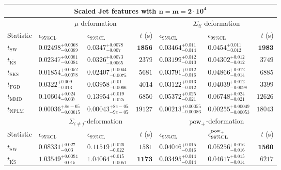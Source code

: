 \begin{tabular}{l|llr|llr}
	\toprule
	\multicolumn{7}{c}{{\bf Scaled Jet features with $\mathbf{n=m=2\cdot 10^{4}}$}} \\
	\toprule
	\multicolumn{1}{c}{} & \multicolumn{3}{c}{$\mu$-deformation} & \multicolumn{3}{c}{$\Sigma_{ii}$-deformation} \\
	Statistic & $\epsilon_{95\%\mathrm{CL}}$ & $\epsilon_{99\%\mathrm    {CL}}$ & $t$ (s) & $\epsilon_{95\%\mathrm{CL}}$ & $\epsilon_{99\%\mathrm{CL}}$ & $t$ (s) \\
	\midrule
	$t_{\mathrm{SW}}$ & $0.02498_{-0.0089}^{+0.0068}$ & $0.0347_{-0.007}^{+0.0078}$ & ${\mathbf{1856}}$ & $0.03464_{-0.014}^{+0.011}$ & $0.0454_{-0.012}^{+0.011}$ & ${\mathbf{1983}}$ \\
	$t_{\overline{\mathrm{KS}}}$ & $0.02347_{-0.0084}^{+0.0081}$ & $0.0326_{-0.0065}^{+0.0073}$ & $2379$ & $0.03199_{-0.013}^{+0.012}$ & $0.04302_{-0.012}^{+0.012}$ & $3749$ \\
	$t_{\mathrm{SKS}}$ & ${\mathbf{0.01854_{-0.0078}^{+0.0052}}}$ & ${\mathbf{0.02407_{-0.0075}^{+0.0044}}}$ & $5681$ & $0.03791_{-0.016}^{+0.012}$ & $0.04866_{-0.014}^{+0.012}$ & $6885$ \\
	$t_{\mathrm{FGD}}$ & $0.0322_{-0.013}^{+0.009}$ & $0.03958_{-0.0066}^{+0.01}$ & $4014$ & ${\mathbf{0.03122_{-0.012}^{+0.013}}}$ & ${\mathbf{0.04039_{-0.0098}^{+0.012}}}$ & $3399$ \\
	$t_{\mathrm{MMD}}$ & $0.10604_{-0.037}^{+0.024}$ & $0.13954_{-0.025}^{+0.019}$ & $6850$ & $0.05372_{-0.021}^{+0.025}$ & $0.06748_{-0.021}^{+0.024}$ & $12626$ \\
\rowcolor{red!35}	$t_{\mathrm{NPLM}}$ & $0.00036_{-0.00015}^{+8e-05}$ & $0.00043_{-9e-05}^{+8e-05}$ & $19127$ & $0.00213_{-0.00086}^{+0.00055}$ & $0.00255_{-0.00053}^{+0.00049}$ & $18043$ \\
	\toprule
	\multicolumn{1}{c}{} & \multicolumn{3}{c}{$\Sigma_{i\neq j}$-deformation} & \multicolumn{3}{c}{$\rm{pow}_{+}$-deformation} \\
	Statistic & $\epsilon_{95\%\mathrm{CL}}$ & $\epsilon_{99\%\mathrm{CL}}$ & $t$ (s) & $\epsilon_{95\%\mathrm{CL}}$ & $\epsilon^{\rm   {pow}_{+}}_{99\%\mathrm{CL}}$ & $t$ (s) \\
	\midrule
	$t_{\mathrm{SW}}$ & $0.08331_{-0.03}^{+0.027}$ & $0.11519_{-0.022}^{+0.026}$ & $1581$ & $0.04046_{-0.016}^{+0.015}$ & $0.05256_{-0.016}^{+0.016}$ & ${\mathbf{1560}}$ \\
	$t_{\overline{\mathrm{KS}}}$ & $1.03549_{-0.015}^{+0.0094}$ & $1.04064_{-0.0051}^{+0.015}$ & ${\mathbf{1173}}$ & $0.03495_{-0.014}^{+0.014}$ & $0.04617_{-0.014}^{+0.015}$ & $6217$ \\

\end{tabular}
